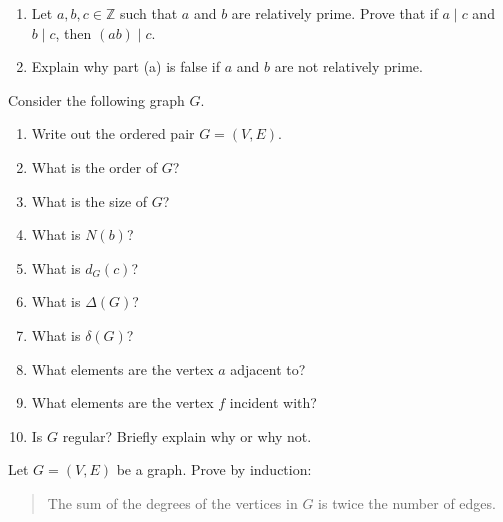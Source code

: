 \documentclass{article}
\newcommand{\Z}{\mathbb{Z}}
\theoremstyle{definition}
\begin{document}
\begin{question}
    \begin{enumerate}
        \item Let $a, b, c\in \Z$ such that $a$ and $b$ are relatively prime. Prove that if $a\mid c$ and $b\mid c$, then $(ab)\mid c$.
        \item Explain why part (a) is false if $a$ and $b$ are not relatively prime.
    \end{enumerate}
\end{question}
\begin{solution}
\end{solution}

\begin{question} 
 Consider the following graph $G$.
     \begin{center}
    \end{center}
    
\begin{enumerate}
	\item Write out the ordered pair $G=(V, E)$.
	\item What is the order of $G$?
	\item What is the size of $G$?
	\item What is $N(b)$?
	\item What is $d_G(c)$?
	\item What is $\Delta(G)$?
	\item What is $\delta(G)$?
	\item What elements are the vertex $a$ adjacent to?
	\item What elements are the vertex $f$ incident with?
	\item Is $G$ regular? Briefly explain why or why not.
	\end{enumerate}
\end{question}
\begin{solution}
\end{solution}

\begin{question}
     Let $G=(V,E)$ be a graph. Prove by induction: 
\begin{quote}
The sum of the degrees of the vertices in $G$ is twice the number of edges.
\end{quote}	
\end{question}
\begin{solution}
\end{solution}
\end{document}
